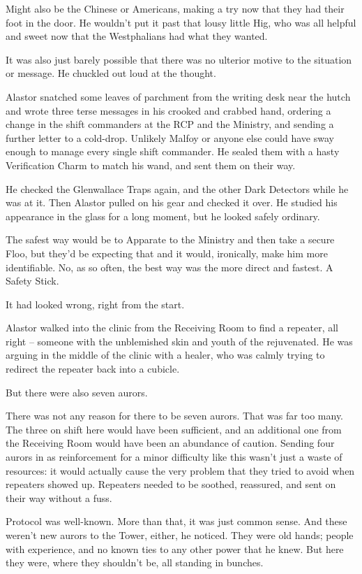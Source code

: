 Might also be the Chinese or Americans, making a try now that they had
their foot in the door. He wouldn't put it past that lousy little Hig,
who was all helpful and sweet now that the Westphalians had what they
wanted.

It was also just barely possible that there was no ulterior motive to
the situation or message. He chuckled out loud at the thought.

Alastor snatched some leaves of parchment from the writing desk near the
hutch and wrote three terse messages in his crooked and crabbed hand,
ordering a change in the shift commanders at the RCP and the Ministry,
and sending a further letter to a cold-drop. Unlikely Malfoy or anyone
else could have sway enough to manage every single shift commander. He
sealed them with a hasty Verification Charm to match his wand, and sent
them on their way.

He checked the Glenwallace Traps again, and the other Dark Detectors
while he was at it. Then Alastor pulled on his gear and checked it over.
He studied his appearance in the glass for a long moment, but he looked
safely ordinary.

The safest way would be to Apparate to the Ministry and then take a
secure Floo, but they'd be expecting that and it would, ironically, make
him more identifiable. No, as so often, the best way was the more direct
and fastest. A Safety Stick.

\mybreak

It had looked wrong, right from the start.

Alastor walked into the clinic from the Receiving Room to find a
repeater, all right -- someone with the unblemished skin and youth of
the rejuvenated. He was arguing in the middle of the clinic with a
healer, who was calmly trying to redirect the repeater back into a
cubicle.

But there were also seven aurors.

There was not any reason for there to be seven aurors. That was far too
many. The three on shift here would have been sufficient, and an
additional one from the Receiving Room would have been an abundance of
caution. Sending four aurors in as reinforcement for a minor difficulty
like this wasn't just a waste of resources: it would actually cause the
very problem that they tried to avoid when repeaters showed up.
Repeaters needed to be soothed, reassured, and sent on their way without
a fuss.

Protocol was well-known. More than that, it was just common sense. And
these weren't new aurors to the Tower, either, he noticed. They were old
hands; people with experience, and no known ties to any other power that
he knew. But here they were, where they shouldn't be, all standing in
bunches.

